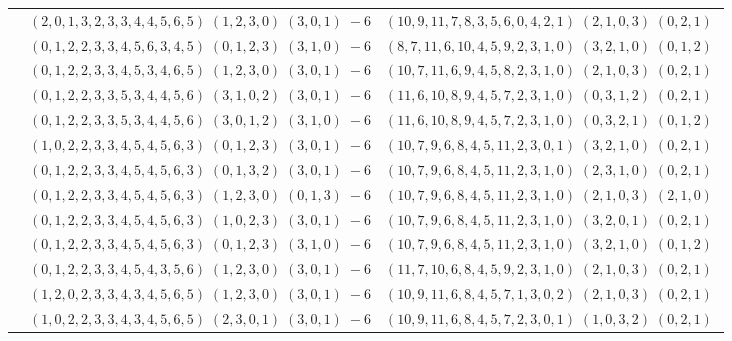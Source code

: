 \documentclass[11pt]{article}
\begin{document}
\begin{longtable}[l]{|c|c|c|}
 \cline{2-3} 
 & $(2 ,0 ,1 ,3 ,2 ,3 ,3 ,4 ,4 ,5 ,6 ,5) \;(1 ,2 ,3 ,0) \;(3 ,0 ,1) \;-6$ & $(10 ,9 ,11 ,7 ,8 ,3 ,5 ,6 ,0 ,4 ,2 ,1) \;(2 ,1 ,0 ,3) \;(0 ,2 ,1) \;$\\ 
 \cline{2-3} 
 & $(0 ,1 ,2 ,2 ,3 ,3 ,4 ,5 ,6 ,3 ,4 ,5) \;(0 ,1 ,2 ,3) \;(3 ,1 ,0) \;-6$ & $(8 ,7 ,11 ,6 ,10 ,4 ,5 ,9 ,2 ,3 ,1 ,0) \;(3 ,2 ,1 ,0) \;(0 ,1 ,2) \;$\\ 
 \cline{2-3} 
 & $(0 ,1 ,2 ,2 ,3 ,3 ,4 ,5 ,3 ,4 ,6 ,5) \;(1 ,2 ,3 ,0) \;(3 ,0 ,1) \;-6$ & $(10 ,7 ,11 ,6 ,9 ,4 ,5 ,8 ,2 ,3 ,1 ,0) \;(2 ,1 ,0 ,3) \;(0 ,2 ,1) \;$\\ 
 \cline{2-3} 
 & $(0 ,1 ,2 ,2 ,3 ,3 ,5 ,3 ,4 ,4 ,5 ,6) \;(3 ,1 ,0 ,2) \;(3 ,0 ,1) \;-6$ & $(11 ,6 ,10 ,8 ,9 ,4 ,5 ,7 ,2 ,3 ,1 ,0) \;(0 ,3 ,1 ,2) \;(0 ,2 ,1) \;$\\ 
 \cline{2-3} 
 & $(0 ,1 ,2 ,2 ,3 ,3 ,5 ,3 ,4 ,4 ,5 ,6) \;(3 ,0 ,1 ,2) \;(3 ,1 ,0) \;-6$ & $(11 ,6 ,10 ,8 ,9 ,4 ,5 ,7 ,2 ,3 ,1 ,0) \;(0 ,3 ,2 ,1) \;(0 ,1 ,2) \;$\\ 
 \cline{2-3} 
 & $(1 ,0 ,2 ,2 ,3 ,3 ,4 ,5 ,4 ,5 ,6 ,3) \;(0 ,1 ,2 ,3) \;(3 ,0 ,1) \;-6$ & $(10 ,7 ,9 ,6 ,8 ,4 ,5 ,11 ,2 ,3 ,0 ,1) \;(3 ,2 ,1 ,0) \;(0 ,2 ,1) \;$\\ 
 \cline{2-3} 
 & $(0 ,1 ,2 ,2 ,3 ,3 ,4 ,5 ,4 ,5 ,6 ,3) \;(0 ,1 ,3 ,2) \;(3 ,0 ,1) \;-6$ & $(10 ,7 ,9 ,6 ,8 ,4 ,5 ,11 ,2 ,3 ,1 ,0) \;(2 ,3 ,1 ,0) \;(0 ,2 ,1) \;$\\ 
 \cline{2-3} 
 & $(0 ,1 ,2 ,2 ,3 ,3 ,4 ,5 ,4 ,5 ,6 ,3) \;(1 ,2 ,3 ,0) \;(0 ,1 ,3) \;-6$ & $(10 ,7 ,9 ,6 ,8 ,4 ,5 ,11 ,2 ,3 ,1 ,0) \;(2 ,1 ,0 ,3) \;(2 ,1 ,0) \;$\\ 
 \cline{2-3} 
 & $(0 ,1 ,2 ,2 ,3 ,3 ,4 ,5 ,4 ,5 ,6 ,3) \;(1 ,0 ,2 ,3) \;(3 ,0 ,1) \;-6$ & $(10 ,7 ,9 ,6 ,8 ,4 ,5 ,11 ,2 ,3 ,1 ,0) \;(3 ,2 ,0 ,1) \;(0 ,2 ,1) \;$\\ 
 \cline{2-3} 
 & $(0 ,1 ,2 ,2 ,3 ,3 ,4 ,5 ,4 ,5 ,6 ,3) \;(0 ,1 ,2 ,3) \;(3 ,1 ,0) \;-6$ & $(10 ,7 ,9 ,6 ,8 ,4 ,5 ,11 ,2 ,3 ,1 ,0) \;(3 ,2 ,1 ,0) \;(0 ,1 ,2) \;$\\ 
 \cline{2-3} 
 & $(0 ,1 ,2 ,2 ,3 ,3 ,4 ,5 ,4 ,3 ,5 ,6) \;(1 ,2 ,3 ,0) \;(3 ,0 ,1) \;-6$ & $(11 ,7 ,10 ,6 ,8 ,4 ,5 ,9 ,2 ,3 ,1 ,0) \;(2 ,1 ,0 ,3) \;(0 ,2 ,1) \;$\\ 
 \cline{2-3} 
 & $(1 ,2 ,0 ,2 ,3 ,3 ,4 ,3 ,4 ,5 ,6 ,5) \;(1 ,2 ,3 ,0) \;(3 ,0 ,1) \;-6$ & $(10 ,9 ,11 ,6 ,8 ,4 ,5 ,7 ,1 ,3 ,0 ,2) \;(2 ,1 ,0 ,3) \;(0 ,2 ,1) \;$\\ 
 \cline{2-3} 
 & $(1 ,0 ,2 ,2 ,3 ,3 ,4 ,3 ,4 ,5 ,6 ,5) \;(2 ,3 ,0 ,1) \;(3 ,0 ,1) \;-6$ & $(10 ,9 ,11 ,6 ,8 ,4 ,5 ,7 ,2 ,3 ,0 ,1) \;(1 ,0 ,3 ,2) \;(0 ,2 ,1) \;$\\ 

\end{longtable}
\end{document}
